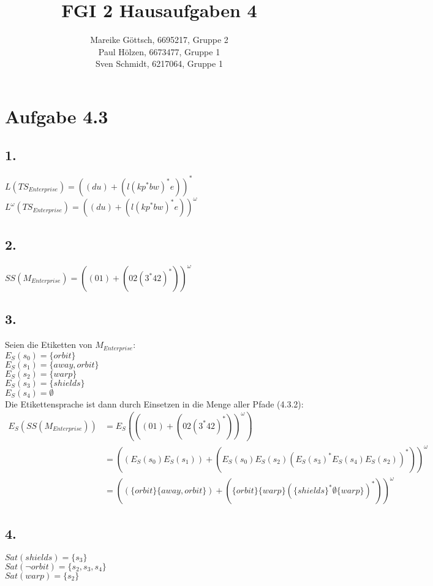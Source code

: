 \documentclass[12pt, paper=a4]{article}
\author{Mareike Göttsch, 6695217, Gruppe 2\\Paul Hölzen, 6673477, Gruppe 1\\Sven Schmidt, 6217064, Gruppe 1}
\title{FGI 2 Hausaufgaben 4}
\begin{document}
\maketitle

\section*{Aufgabe 4.3}

\subsection*{1.}
$L(TS_{Enterprise}) = ((du) + (l(kp^*bw)^*e))^*$\\
$L^\omega(TS_{Enterprise}) = ((du) + (l(kp^*bw)^*e))^\omega$\\

\subsection*{2.}
$SS(M_{Enterprise}) = ((01) + (02(3^*42)^*))^\omega$\\

\subsection*{3.}
Seien die Etiketten von $M_{Enterprise}$:\\
$E_S(s_0) = \{orbit\}$\\
$E_S(s_1) = \{away, orbit\}$\\
$E_S(s_2) = \{warp\}$\\
$E_S(s_3) = \{shields\}$\\
$E_S(s_4) = \emptyset$\\

Die Etikettensprache ist dann durch Einsetzen in die Menge aller Pfade (4.3.2):\\
\begin{align*}
E_S(SS(M_{Enterprise})) &= E_S(((01) + (02(3^*42)^*))^\omega)\\
&= ((E_S(s_0)E_S(s_1)) + (E_S(s_0)E_S(s_2)(E_S(s_3)^*E_S(s_4)E_S(s_2))^*))^\omega\\
&= ((\{orbit\}\{away, orbit\}) + (\{orbit\}\{warp\}(\{shields\}^*\emptyset\{warp\})^*))^\omega
\end{align*}

\subsection*{4.}
$Sat(shields) = \{s_3\}$\\
$Sat(\neg orbit) = \{s_2, s_3, s_4\}$\\
$Sat(warp) = \{s_2\}$\\
\end{document}
